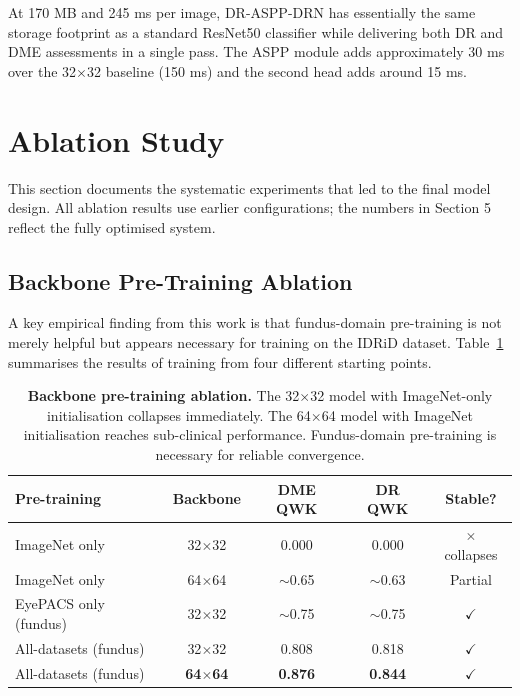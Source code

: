 \documentclass[12pt,a4paper]{article}
\begin{document}
At 170 MB and 245 ms per image, DR-ASPP-DRN has essentially the same storage footprint as a standard ResNet50 classifier while delivering both DR and DME assessments in a single pass. The ASPP module adds approximately 30 ms over the 32$\times$32 baseline (150 ms) and the second head adds around 15 ms.

\newpage

\section{Ablation Study}

This section documents the systematic experiments that led to the final model design. All ablation results use earlier configurations; the numbers in Section 5 reflect the fully optimised system.

\subsection{Backbone Pre-Training Ablation}

A key empirical finding from this work is that fundus-domain pre-training is not merely helpful but appears necessary for training on the IDRiD dataset. Table~\ref{tab:pretrain_ablation} summarises the results of training from four different starting points.

\begin{table}[H]
\centering
\small
\caption{\textbf{Backbone pre-training ablation.} The 32$\times$32 model with ImageNet-only initialisation collapses immediately. The 64$\times$64 model with ImageNet initialisation reaches sub-clinical performance. Fundus-domain pre-training is necessary for reliable convergence.}
\label{tab:pretrain_ablation}
\begin{tabular}{|l|c|c|c|c|}
\hline
\textbf{Pre-training} & \textbf{Backbone} & \textbf{DME QWK} & \textbf{DR QWK} & \textbf{Stable?} \\
\hline
ImageNet only & 32$\times$32 & 0.000 & 0.000 & $\times$ collapses \\
ImageNet only & 64$\times$64 & $\sim$0.65 & $\sim$0.63 & Partial \\
EyePACS only (fundus) & 32$\times$32 & $\sim$0.75 & $\sim$0.75 & $\checkmark$ \\
All-datasets (fundus) & 32$\times$32 & 0.808 & 0.818 & $\checkmark$ \\
All-datasets (fundus) & \textbf{64$\times$64} & \textbf{0.876} & \textbf{0.844} & $\checkmark$ \\
\hline
\end{tabular}
\end{table}
\end{document}
